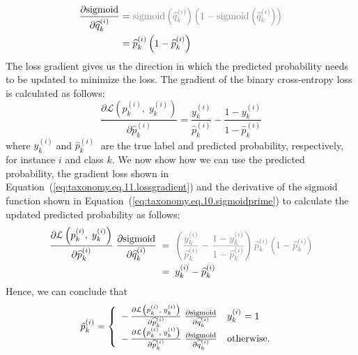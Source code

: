 \begin{align}
    \label{eq:taxonomy.eq.10.sigmoidprime}
    \frac{\partial{\text{sigmoid}}}{\partial{\widehat{q}_k^{(i)}}}
    & = \textcolor{gray}{\text{sigmoid}\left(\widehat{q}_k^{(i)}\right)\left(1-\text{sigmoid}\left(\widehat{q}_k^{(i)}\right)\right)}
    \\
    & = \widehat{p}_k^{(i)}\left(1-\widehat{p}_k^{(i)}\right)
\end{align}
The loss gradient gives us the direction in which the predicted probability needs to be updated to minimize the loss. The gradient of the binary cross-entropy loss is calculated as follows:
\begin{equation}
    \label{eq:taxonomy.eq.11.lossgradient}
    \frac{\partial \mathcal{L} \left( \widehat{p}_k^{(i)},\;y_k^{(i)}\right)}{\partial \widehat{p}_k^{(i)} }=\frac{y_k^{(i)}}{\widehat{p}_k^{(i)}}-\frac{1-y_k^{(i)}}{1-\widehat{p}_k^{(i)}}
\end{equation}
where $y_k^{(i)}\; $and $\widehat{p}_k^{(i)}\; $ are the true label and predicted probability, respectively, for instance $i $ and class $k $.
We now show how we can use the predicted probability, the gradient loss shown in Equation~(\ref{eq:taxonomy.eq.11.lossgradient}) and the derivative of the sigmoid function shown in Equation~(\ref{eq:taxonomy.eq.10.sigmoidprime}) to calculate the updated predicted probability as follows:
\begin{align}
    \label{eq:taxonomy.eq.12.newpredelement}
    \frac{\partial \mathcal{L}\left(p_k^{(i)},\; y_k^{(i)}\right)}{\partial \widehat{p}_k^{(i)} }\; \frac{\partial{\text{sigmoid}}}{\partial{\widehat{q}_k^{(i)}}}
    & \; = \; \textcolor{gray}{\left(\frac{y_k^{(i)}}{\widehat{p}_k^{(i)}}-\frac{1-y_k^{(i)}}{1-\widehat{p}_k^{(i)}}\right)\widehat{p}_k^{(i)}\left(1-\widehat{p}_k^{(i)}\right) }
    \\
    & \; = \; y_k^{(i)}-\widehat{p}_k^{(i)}
\end{align}
Hence, we can conclude that
\begin{equation}
    \label{eq:taxonomy.eq.13.newpred}
    \begin{array}{@{}l}
    \hat{p}_{k}^{(i)} = \left\{
        \begin{array}{ll}
            -\, \frac{\partial \mathcal{L}\left(p_k^{(i)},\;y_k^{(i)}\right)}{\partial \widehat{p}_k^{(i)} }\;{ \frac{\partial{\text{sigmoid}}}{\partial{\widehat{q}_k^{(i)}}}}
            &
            y_k^{(i)}=1
            \\
            -\,\frac{\partial \mathcal{L}\left(p_k^{(i)},\;y_k^{(i)}\right)}{\partial \widehat{p}_k^{(i)} }\; {\frac{\partial{\text{sigmoid}}}{\partial{\widehat{q}_k^{(i)}}}}
            &
            \text{otherwise.}
        \end{array}\right.
    \end{array}
\end{equation}

